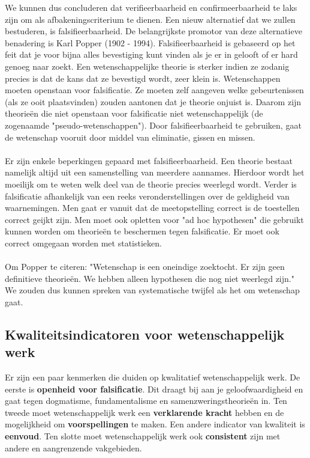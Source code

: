 \documentclass[../summary.tex]{subfiles}
\begin{document}
	We kunnen dus concluderen dat verifieerbaarheid en confirmeerbaarheid te laks zijn om als afbakeningscriterium te dienen. Een nieuw alternatief dat we zullen bestuderen, is falsifieerbaarheid. De belangrijkste promotor van deze alternatieve benadering is Karl Popper (1902 - 1994). Falsifieerbaarheid is gebaseerd op het feit dat je voor bijna alles bevestiging kunt vinden als je er in gelooft of er hard genoeg naar zoekt. Een wetenschappelijke theorie is sterker indien ze zodanig precies is dat de kans dat ze
	bevestigd wordt, zeer klein is. Wetenschappen moeten openstaan voor falsificatie. Ze moeten zelf aangeven welke gebeurtenissen (als ze ooit plaatsvinden) zouden aantonen dat je theorie onjuist is. Daarom zijn theorieën die niet openstaan voor falsificatie niet wetenschappelijk (de zogenaamde "pseudo-wetenschappen"). Door falsifieerbaarheid te gebruiken, gaat de wetenschap vooruit door middel van eliminatie, gissen en missen. 
	\\\\
	Er zijn enkele beperkingen gepaard met falsifieerbaarheid. Een theorie bestaat namelijk altijd uit een samenstelling van meerdere aannames. Hierdoor wordt het moeilijk om te weten welk deel van de theorie precies weerlegd wordt. Verder is falsificatie afhankelijk van een reeks veronderstellingen over de geldigheid van waarnemingen. Men gaat er vanuit dat de meetopstelling correct is de toestellen correct geijkt zijn. Men moet ook opletten voor "ad hoc hypothesen" die gebruikt kunnen worden om theorieën te beschermen tegen falsificatie. Er moet ook correct omgegaan worden met statistieken.
	\\\\
	Om Popper te citeren: "Wetenschap is een oneindige zoektocht. Er zijn geen definitieve
	theorieën. We hebben alleen hypothesen die nog niet weerlegd zijn." We zouden dus kunnen spreken van systematische twijfel als het om wetenschap gaat.
	
	\subsection{Kwaliteitsindicatoren voor wetenschappelijk werk}
	
	Er zijn een paar kenmerken die duiden op kwalitatief wetenschappelijk werk. De eerste is \textbf{openheid voor falsificatie}. Dit draagt bij aan je geloofwaardigheid en gaat tegen dogmatisme, fundamentalisme en samenzweringstheorieën in. Ten tweede moet wetenschappelijk werk een \textbf{verklarende kracht} hebben en de mogelijkheid om \textbf{voorspellingen} te maken. Een andere indicator van kwaliteit is \textbf{eenvoud}. Ten slotte moet wetenschappelijk werk ook \textbf{consistent} zijn met andere en aangrenzende vakgebieden.
	
\end{document}
